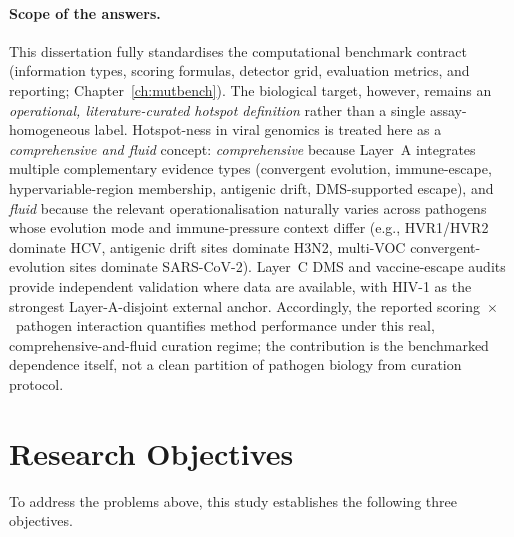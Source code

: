 \paragraph{Scope of the answers.}
\label{para:intro_scope}
This dissertation fully standardises the computational benchmark contract (information types, scoring formulas, detector grid, evaluation metrics, and reporting; Chapter~\ref{ch:mutbench}). The biological target, however, remains an \emph{operational, literature-curated hotspot definition} rather than a single assay-homogeneous label. Hotspot-ness in viral genomics is treated here as a \emph{comprehensive and fluid} concept: \emph{comprehensive} because Layer~A integrates multiple complementary evidence types (convergent evolution, immune-escape, hypervariable-region membership, antigenic drift, DMS-supported escape), and \emph{fluid} because the relevant operationalisation naturally varies across pathogens whose evolution mode and immune-pressure context differ (e.g., HVR1/HVR2 dominate HCV, antigenic drift sites dominate H3N2, multi-VOC convergent-evolution sites dominate SARS-CoV-2). Layer~C DMS and vaccine-escape audits provide independent validation where data are available, with HIV-1 as the strongest Layer-A-disjoint external anchor. Accordingly, the reported scoring~$\times$~pathogen interaction quantifies method performance under this real, comprehensive-and-fluid curation regime; the contribution is the benchmarked dependence itself, not a clean partition of pathogen biology from curation protocol.


\section{Research Objectives}
\label{sec:intro_objectives}

To address the problems above, this study establishes the following three objectives.

